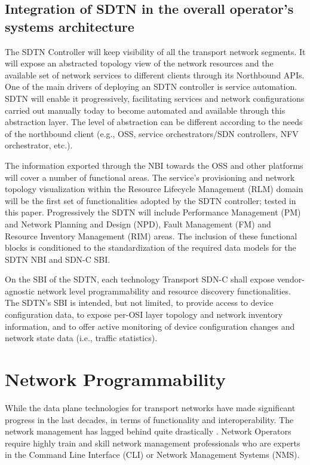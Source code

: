 \documentclass[a4paper,fleqn]{cas-dc}
\begin{document}
\subsection{Integration of SDTN in the overall operator’s systems architecture}
\label{section:sdtn}
The SDTN Controller will keep visibility of all the transport network segments. It will expose an abstracted topology view of the network resources and the available set of network services to different clients through its Northbound APIs.  
One of the main drivers of deploying an SDTN controller is service automation. SDTN will enable it progressively, facilitating services and network configurations carried out manually today to become automated and available through this abstraction layer.  The level of abstraction can be different according to the needs of the northbound client (e.g., OSS, service orchestrators/SDN controllers, NFV orchestrator, etc.). 

The information exported through the NBI towards the OSS and other platforms will cover a number of functional areas. The service’s provisioning and network topology visualization within the Resource Lifecycle Management (RLM) domain will be the first set of functionalities adopted by the SDTN controller; tested in this paper. Progressively the SDTN will include Performance Management (PM) and Network Planning and Design (NPD), Fault Management (FM) and Resource Inventory Management (RIM) areas. The inclusion of these functional blocks is conditioned to the standardization of the required data models for the SDTN NBI and SDN-C SBI.

On the SBI of the SDTN, each technology Transport SDN-C shall expose vendor-agnostic network level programmability and resource discovery functionalities. The SDTN's SBI is intended, but not limited, to provide access to device configuration data, to expose per-OSI layer topology and network inventory information, and to offer active monitoring of device configuration changes and network state data (i.e., traffic statistics). 

\section{Network Programmability}
\label{section:net}

While the data plane technologies for transport networks have made significant progress in the last decades, in terms of functionality and interoperability. The network management has lagged behind quite drastically \cite{claise2019network,edelman2018network}. Network Operators require highly train and skill network management professionals who are experts in the Command Line Interface (CLI) or Network Management Systems (NMS). 
\end{document}
